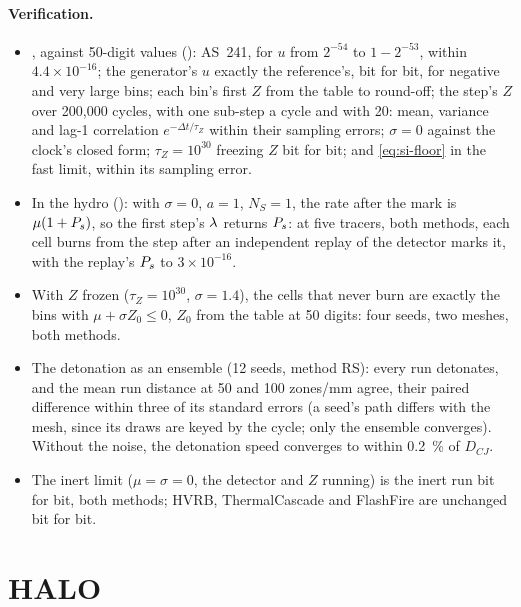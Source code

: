 \paragraph{Verification.}
\begin{itemize}
\item {}, against 50-digit values ():
  AS~241, for $u$ from $2^{-54}$ to $1 - 2^{-53}$, within $4.4\times10^{-16}$; the
  generator's $u$ exactly the reference's, bit for bit, for negative and
  very large bins; each bin's first $Z$ from the table to round-off; the
  step's $Z$ over 200,000 cycles, with one sub-step a cycle and with 20:
  mean, variance and lag-1 correlation $e^{-\Delta t/\tau_Z}$ within their
  sampling errors; $\sigma = 0$ against the clock's closed form; $\tau_Z =
  10^{30}$ freezing $Z$ bit for bit; and \cref{eq:si-floor} in the fast
  limit, within its sampling error.
\item In the hydro (): with $\sigma =
  0$, $a = 1$, $N_S = 1$, the rate after the mark is $\mu(1 + P_{s})$, so the
  first step's $\lambda$ returns $P_{s}$: at five tracers, both methods, each cell
  burns from the step after an independent replay of the detector marks it,
  with the replay's $P_{s}$ to $3\times10^{-16}$.
\item With $Z$ frozen ($\tau_Z = 10^{30}$, $\sigma = 1.4$), the cells that
  never burn are exactly the bins with $\mu + \sigma Z_0 \le 0$, $Z_0$ from
  the table at 50 digits: four seeds, two meshes, both methods.
\item The detonation as an ensemble (12 seeds, method RS): every run
  detonates, and the mean run distance at 50 and 100 zones/mm agree, their
  paired difference within three of its standard errors (a seed's path
  differs with the mesh, since its draws are keyed by the cycle; only the
  ensemble converges). Without the
  noise, the detonation speed converges to within 0.2~\% of $D_{CJ}$.
\item The inert limit ($\mu = \sigma = 0$, the detector and $Z$ running) is
  the inert run bit for bit, both methods; HVRB, ThermalCascade and FlashFire
  are unchanged bit for bit.
\end{itemize}

\section{HALO}
\label{sec:halo}

